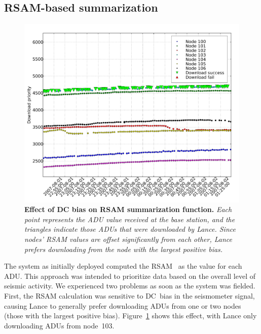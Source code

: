 
\pagebreak
\subsection{RSAM-based summarization}

\begin{figure}[t]
\begin{center}
\includegraphics[width=1.0\hsize]{./figs/deploy/downloads-pre-median-filter5.pdf}
\end{center}
\caption{\small {\bf Effect of DC bias on RSAM summarization
function.} {\em Each point represents the ADU value received at
the base station, and the triangles indicate those ADUs that were
downloaded by Lance. Since nodes' RSAM values are
offset significantly from each other, Lance prefers
downloading from the node with the largest positive bias.}}
\label{fig-rsam-dc-bias}
\end{figure}

The system as initially deployed computed the RSAM~\cite{rsam} as the
value for each ADU.
This approach was intended to prioritize data based on
the overall level of seismic activity. We experienced two problems as
soon as the system was fielded. First, the RSAM calculation was
sensitive to DC~bias in the seismometer signal, causing Lance to 
generally prefer downloading ADUs from one or two nodes (those with
the largest positive bias). Figure~\ref{fig-rsam-dc-bias} shows this
effect, with Lance only downloading ADUs from node~103.

